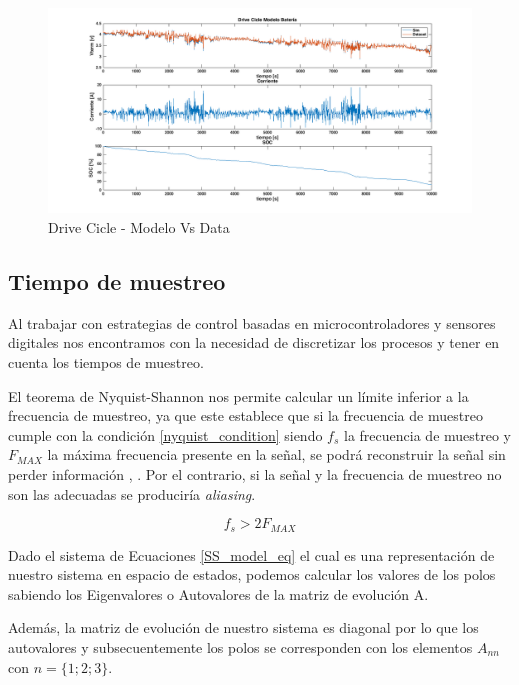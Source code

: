 \documentclass[10pt, a4paper]{article}
\begin{document}
\begin{figure}[!h]
    \centering
    \includegraphics[width=1\linewidth]{Drive_Cicle_Modelo_Bateria.png}
    \caption{Drive Cicle - Modelo Vs Data}                             
    \label{fig:DC_modVsData}                                          
\end{figure}

\subsection{Tiempo de muestreo}

Al trabajar con estrategias de control basadas en microcontroladores y sensores
digitales nos encontramos con la necesidad de discretizar los procesos y tener
en cuenta los tiempos de muestreo.

El teorema de Nyquist-Shannon nos permite calcular un límite inferior a la
frecuencia de muestreo, ya que este establece que si la frecuencia de muestreo
cumple con la condición \ref{nyquist_condition} siendo $f_s$ la frecuencia de
muestreo y $F_{MAX}$ la máxima frecuencia presente en la señal, se podrá
reconstruir la señal sin perder información \cite{Nyquist1928},
\cite{Shannon1949}.  Por el contrario, si la señal y la frecuencia de muestreo
no son las adecuadas se produciría \emph{aliasing}.

\begin{equation}
	f_s > 2 F_{MAX}
	\label{nyquist_condition}
\end{equation}

Dado el sistema de Ecuaciones \ref{SS_model_eq} el cual es una representación de
nuestro sistema en espacio de estados, podemos calcular los valores de los polos
sabiendo los Eigenvalores o Autovalores de la matriz de evolución A.

Además, la matriz de evolución de nuestro sistema es diagonal por lo que los
autovalores y subsecuentemente los polos se corresponden con los elementos
$A_{nn}$ con $n=\{1;2;3\}$.
\end{document}
